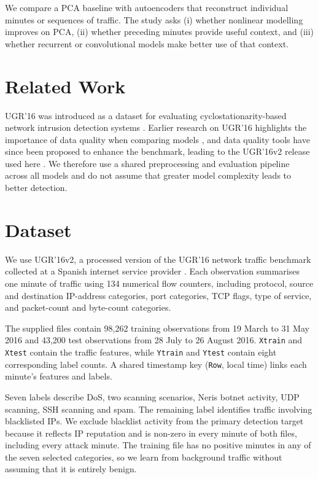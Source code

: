 \documentclass[conference]{IEEEtran}
\begin{document}
We compare a PCA baseline with autoencoders that reconstruct individual minutes or sequences of traffic. The study asks (i) whether nonlinear modelling improves on PCA, (ii) whether preceding minutes provide useful context, and (iii) whether recurrent or convolutional models make better use of that context.

\section{Related Work}
UGR'16 was introduced as a dataset for evaluating cyclostationarity-based network intrusion detection systems \cite{macia2018}. Earlier research on UGR'16 highlights the importance of data quality when comparing models \cite{camacho2023}, and data quality tools have since been proposed to enhance the benchmark, leading to the UGR'16v2 release used here \cite{camacho2025}. We therefore use a shared preprocessing and evaluation pipeline across all models and do not assume that greater model complexity leads to better detection.

\section{Dataset}
We use UGR'16v2, a processed version of the UGR'16 network traffic benchmark collected at a Spanish internet service provider \cite{camacho2025,macia2018}. Each observation summarises one minute of traffic using 134 numerical flow counters, including protocol, source and destination IP-address categories, port categories, TCP flags, type of service, and packet-count and byte-count categories.

The supplied files contain 98,262 training observations from 19 March to 31 May 2016 and 43,200 test observations from 28 July to 26 August 2016. \texttt{Xtrain} and \texttt{Xtest} contain the traffic features, while \texttt{Ytrain} and \texttt{Ytest} contain eight corresponding label counts. A shared timestamp key (\texttt{Row}, local time) links each minute's features and labels.

Seven labels describe DoS, two scanning scenarios, Neris botnet activity, UDP scanning, SSH scanning and spam. The remaining label identifies traffic involving blacklisted IPs. We exclude blacklist activity from the primary detection target because it reflects IP reputation and is non-zero in every minute of both files, including every attack minute. The training file has no positive minutes in any of the seven selected categories, so we learn from background traffic without assuming that it is entirely benign.
\end{document}
